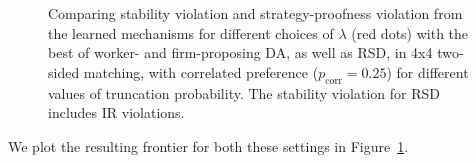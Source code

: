 \begin{figure}[h!]
\begin{subfigure}[b]{0.49\textwidth}
\end{subfigure}
\caption{\label{fig:frontier_add} Comparing stability violation and strategy-proofness violation from the learned mechanisms for different choices of $\lambda$ (red dots) with the best of worker- and firm-proposing DA, as well as RSD, in 4x4 two-sided matching, with correlated preference ($p_{\mathrm{corr}} = 0.25$) for different values of truncation probability. The stability violation for RSD includes IR violations.}
\vspace{-10pt}
\end{figure}

We plot the resulting frontier for both these settings in Figure~\ref{fig:frontier_add}.